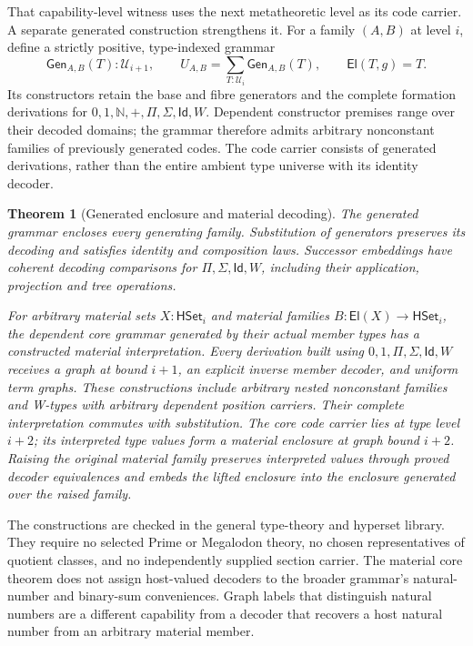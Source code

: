 \documentclass[11pt]{article}
\newtheorem{theorem}{Theorem}
\theoremstyle{definition}
\theoremstyle{remark}
\begin{document}
That capability-level witness uses the next metatheoretic level as its code
carrier.  A separate generated construction strengthens it.  For a family
$(A,B)$ at level $i$, define a strictly positive, type-indexed grammar
\[
  \mathsf{Gen}_{A,B}(T):\mathcal U_{i+1},
  \qquad
  U_{A,B}=\sum_{T:\mathcal U_i}\mathsf{Gen}_{A,B}(T),
  \qquad
  \mathsf{El}(T,g)=T.
\]
Its constructors retain the base and fibre generators and the complete
formation derivations for $0,1,\mathbb N,+,\Pi,\Sigma,\mathsf{Id},W$.
Dependent constructor premises range over their decoded domains; the grammar
therefore admits arbitrary nonconstant families of previously generated codes.
The code carrier consists of generated derivations, rather than the entire
ambient type universe with its identity decoder.

\begin{theorem}[Generated enclosure and material decoding]
The generated grammar encloses every generating family.  Substitution of
generators preserves its decoding and satisfies identity and composition laws.
Successor embeddings have coherent decoding comparisons for
$\Pi,\Sigma,\mathsf{Id},W$, including their application, projection and tree
operations.

For arbitrary material sets $X:\mathsf{HSet}_i$ and material families
$B:\mathsf{El}(X)\to\mathsf{HSet}_i$, the dependent core grammar generated by
their actual member types has a constructed material interpretation.  Every
derivation built using $0,1,\Pi,\Sigma,\mathsf{Id},W$ receives a graph at bound
$i+1$, an explicit inverse member decoder, and uniform term graphs.  These
constructions include arbitrary nested nonconstant families and W-types with
arbitrary dependent position carriers.  Their complete interpretation commutes
with substitution.  The core code carrier lies at type level $i+2$; its
interpreted type values form a material enclosure at graph bound $i+2$.
Raising the original material family preserves interpreted values through
proved decoder equivalences and embeds the lifted enclosure into the enclosure
generated over the raised family.
\end{theorem}

The constructions are checked in the general type-theory and hyperset library.
They require no selected Prime or Megalodon theory, no chosen representatives
of quotient classes, and no independently supplied section carrier.  The
material core theorem does not assign host-valued decoders to the broader
grammar's natural-number and binary-sum conveniences.  Graph labels that
distinguish natural numbers are a different capability from a decoder that
recovers a host natural number from an arbitrary material member.
\end{document}
